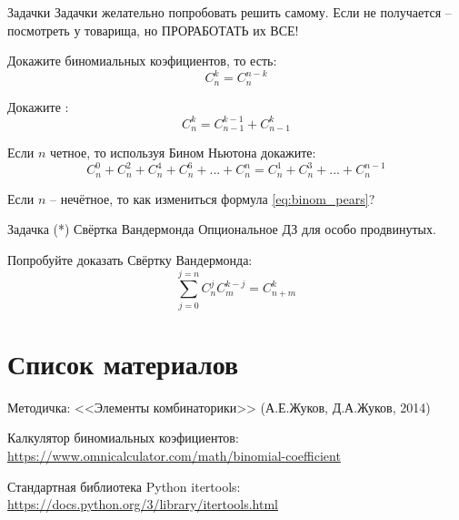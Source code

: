 \begin{frame}{Задачки}
	Задачки желательно попробовать решить самому.
	Если не получается -- посмотреть у товарища, но ПРОРАБОТАТЬ
	их ВСЕ!
	
	Докажите  биномиальных коэфициентов, то есть:
	\begin{equation}
		C_{n}^{k} = C_{n}^{n-k}
	\end{equation}
	
	Докажите :
	\begin{equation}
		C_{n}^{k} = C_{n-1}^{k-1} + C_{n-1}^{k}
	\end{equation}
	
	Если $n$ четное, то используя Бином Ньютона докажите:
	\begin{equation}\label{eq:binom_pears}
		C_n^{0} + C_n^{2} + C_n^{4} + C_n^{6} + ... + C_n^{n} = C_n^{1} + C_n^{3} + ... + C_n^{n-1}
	\end{equation}
	
	Если $n$ -- нечётное, то как измениться формула \eqref{eq:binom_pears}?
	
\end{frame}

\begin{frame}{Задачка (*) Свёртка Вандермонда}
	Опциональное ДЗ для особо продвинутых.
	
	Попробуйте доказать Свёртку Вандермонда:
	\begin{equation}
		\sum_{j=0}^{j=n} C_{n}^{j} C_{m}^{k-j} = C_{n+m}^{k}
	\end{equation}
	
\end{frame}

\section{Список материалов}

\begin{frame}

Методичка: <<Элементы комбинаторики>> (А.Е.Жуков, Д.А.Жуков, 2014)

Калкулятор биномиальных коэфициентов: \url{https://www.omnicalculator.com/math/binomial-coefficient}

Стандартная библиотека Python itertools: \url{https://docs.python.org/3/library/itertools.html}

\end{frame}

  
